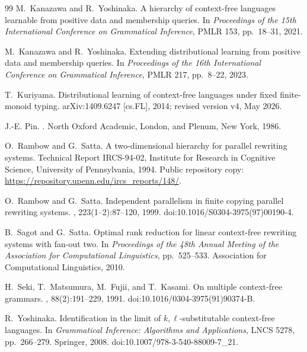 \documentclass[11pt,a4paper]{ltjsarticle}
\numberwithin{equation}{section}
\theoremstyle{plain}
\theoremstyle{definition}
\theoremstyle{remark}
\begin{document}
\begin{thebibliography}{99}
M.~Kanazawa and R.~Yoshinaka.
\newblock A hierarchy of context-free languages learnable from positive data
and membership queries.
\newblock In {\em Proceedings of the 15th International Conference on
Grammatical Inference}, PMLR 153, pp.~18--31, 2021.

M.~Kanazawa and R.~Yoshinaka.
\newblock Extending distributional learning from positive data and membership
queries.
\newblock In {\em Proceedings of the 16th International Conference on
Grammatical Inference}, PMLR 217, pp.~8--22, 2023.

T.~Kuriyama.
\newblock Distributional learning of context-free languages under fixed finite-monoid typing.
\newblock arXiv:1409.6247 [cs.FL], 2014; revised version v4, May 2026.

J.-E. Pin.
.
\newblock North Oxford Academic, London, and Plenum, New York, 1986.

O.~Rambow and G.~Satta.
\newblock A two-dimensional hierarchy for parallel rewriting systems.
\newblock Technical Report IRCS-94-02, Institute for Research in Cognitive
Science, University of Pennsylvania, 1994.
\newblock Public repository copy:
\url{https://repository.upenn.edu/ircs_reports/148/}.

O.~Rambow and G.~Satta.
\newblock Independent parallelism in finite copying parallel rewriting systems.
, 223(1--2):87--120, 1999.
\newblock doi:10.1016/S0304-3975(97)00190-4.

B.~Sagot and G.~Satta.
\newblock Optimal rank reduction for linear context-free rewriting systems with fan-out two.
\newblock In {\em Proceedings of the 48th Annual Meeting of the Association for
Computational Linguistics}, pp.~525--533. Association for Computational Linguistics, 2010.

H.~Seki, T.~Matsumura, M.~Fujii, and T.~Kasami.
\newblock On multiple context-free grammars.
, 88(2):191--229, 1991.
\newblock doi:10.1016/0304-3975(91)90374-B.

R.~Yoshinaka.
\newblock Identification in the limit of \(k,\ell\)-substitutable context-free
 languages.
\newblock In {\em Grammatical Inference: Algorithms and Applications},
 LNCS 5278, pp.~266--279. Springer, 2008.
\newblock doi:10.1007/978-3-540-88009-7\_21.


\end{thebibliography}
\end{document}
